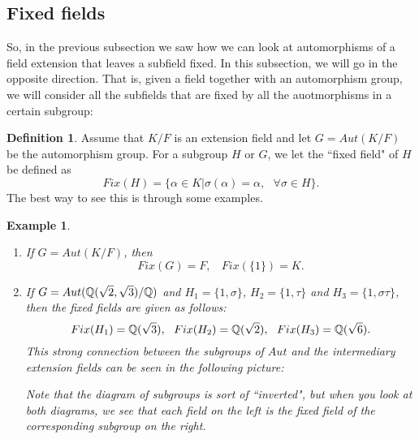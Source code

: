 \documentclass[12pt]{article}
\theoremstyle{plain}
\newtheorem{example}{Example}
\theoremstyle{definition}
\newtheorem{definition}{Definition}
\theoremstyle{remark}
\begin{document}
\subsection{Fixed fields} So, in the previous subsection we saw how we can look at automorphisms of a field extension that leaves a subfield fixed. In this subsection, we will go in the opposite direction. That is, given a field together with an automorphism group, we will consider all the subfields that are fixed by all the auotmorphisms in a certain subgroup:
\begin{definition}
 Assume that $K/F$ is an extension field and let $G=Aut(K/F)$ be the automorphism group. For a subgroup $H$ or $G$, we let the ``fixed field" of $H$ be defined as
 $$Fix(H) = \{\alpha\in K|\sigma(\alpha)=\alpha, \:\:\:\forall \sigma \in H\}.$$
 The best way to see this is through some examples.
 \begin{example}
 \begin{enumerate}
     \item If $G = Aut(K/F)$, then
     $$Fix(G) = F, \:\:\:\: Fix(\{\mathfrak{1}\})=K.$$
     \item If $G = Aut(\mathbb{Q}(\sqrt{2},\sqrt{3})/\mathbb{Q})$ and $H_1 = \{\mathfrak{1}, \sigma\}$, $H_2 = \{\mathfrak{1}, \tau\}$ and $H_3=\{\mathfrak{1}, \sigma \tau\}$, then the fixed fields are given as follows:
     $$Fix(H_1) = \mathbb{Q}(\sqrt{3}), \:\:\: Fix(H_2) = \mathbb{Q}(\sqrt{2}), \:\:\: Fix(H_3)=\mathbb{Q}(\sqrt{6}).$$
    This strong connection between the subgroups of $Aut$ and the intermediary extension fields can be seen in the following picture:


Note that the diagram of subgroups is sort of ``inverted", but when you look at both diagrams, we see that each field on the left is the fixed field of the corresponding subgroup on the right.
\end{enumerate}
\end{example}
\end{definition}
\end{document}

